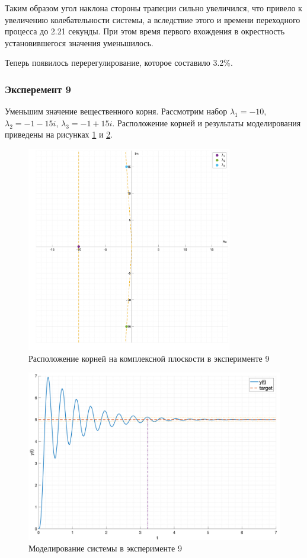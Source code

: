 Таким образом угол наклона стороны трапеции сильно увеличился, что привело к увеличению
колебательности системы, а вследствие этого и времени переходного процесса до 2.21 секунды. При этом время 
первого вхождения в окрестность установившегося значения уменьшилось.  

Теперь появилось перерегулирование, которое составило 3.2\%. 

\subsubsection{Эксперемент 9}
\label{task2_case9}
Уменьшим значение вещественного корня. Рассмотрим набор
$\lambda_1 = -10$, $\lambda_2 = -1 - 15i$, $\lambda_3 = -1 + 15i$.
Расположение корней и результаты моделирования приведены на рисунках
\ref{fig:task_2_points9} и \ref{fig:task_2_case9}.
\begin{figure}
    \centering
    \includegraphics[width=0.8\textwidth]{media/plots/task2_points9.png}
    \caption{Расположение корней на комплексной плоскости в эксперименте 9}
    \label{fig:task_2_points9}
\end{figure}

\begin{figure}
    \centering
    \includegraphics[width=\textwidth]{media/plots/task2_case9.png}
    \caption{Моделирование системы в эксперименте 9}
    \label{fig:task_2_case9}
\end{figure}

